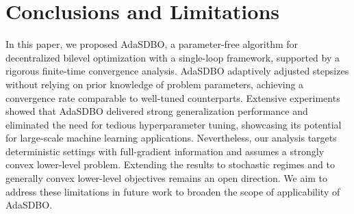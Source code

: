 \documentclass{article}
\theoremstyle{plain}
\theoremstyle{definition}
\theoremstyle{remark}
\begin{document}
\vspace{-0.2cm}
\section{Conclusions and Limitations}\label{limits}
\vspace{-0.1cm}
In this paper, we proposed AdaSDBO, a parameter-free algorithm for decentralized bilevel optimization with a single-loop framework, supported by a rigorous finite-time convergence analysis. AdaSDBO adaptively adjusted stepsizes without relying on prior knowledge of problem parameters, achieving a convergence rate comparable to well-tuned counterparts. Extensive experiments showed that AdaSDBO delivered strong generalization performance and eliminated the need for tedious hyperparameter tuning, showcasing its potential for large-scale machine learning applications. Nevertheless, our analysis targets deterministic settings with full-gradient information and assumes a strongly convex lower-level problem. Extending the results to stochastic regimes and to generally convex lower-level objectives remains an open direction. We aim to address these limitations in future work to broaden the scope of applicability of AdaSDBO.




\newpage
\appendix
\end{document}
